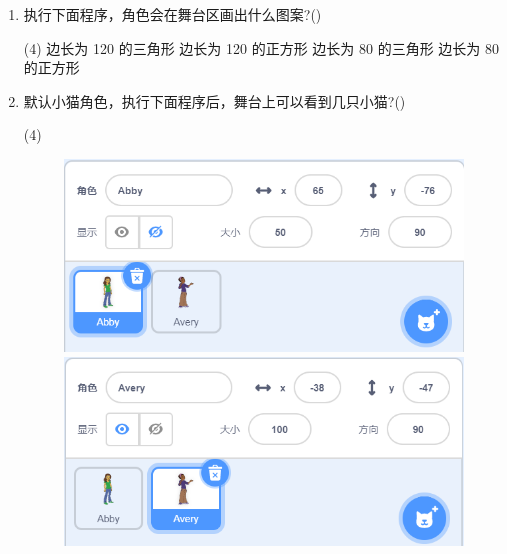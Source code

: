 \documentclass[10pt, a4paper]{article}
\begin{document}
\begin{enumerate}
        \item 执行下面程序，角色会在舞台区画出什么图案?(\qquad)
        \begin{tasks}(4)
            \task 边长为 120 的三角形
            \task 边长为 120 的正方形
            \task 边长为 80  的三角形
            \task 边长为 80  的正方形
        \end{tasks}

        \item 默认小猫角色，执行下面程序后，舞台上可以看到几只小猫?(\qquad)
        \begin{tasks}(4)
        \end{tasks}

          \begin{figure}[htbp]
            \centering
            \begin{minipage}[t]{.6\textwidth}
                \centering
                \begin{minipage}[t]{.48\textwidth}
                    \centering
                    \includegraphics[width=\textwidth]{6-1.png}
                \end{minipage}
                \begin{minipage}[t]{.48\textwidth}
                    \centering
                    \includegraphics[width=\textwidth]{6-2.png}

\end{minipage}
\end{minipage}
\end{figure}
\end{enumerate}
\end{document}
